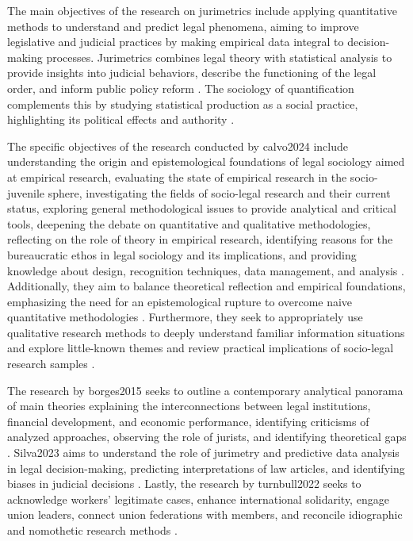 The main objectives of the research on jurimetrics include applying quantitative methods to understand and predict legal phenomena, aiming to improve legislative and judicial practices by making empirical data integral to decision-making processes. Jurimetrics combines legal theory with statistical analysis to provide insights into judicial behaviors, describe the functioning of the legal order, and inform public policy reform \cite{nunes2018, nunes2018, nunes2018, de2010}. The sociology of quantification complements this by studying statistical production as a social practice, highlighting its political effects and authority \cite{paiva2021}.

The specific objectives of the research conducted by calvo2024 include understanding the origin and epistemological foundations of legal sociology aimed at empirical research, evaluating the state of empirical research in the socio-juvenile sphere, investigating the fields of socio-legal research and their current status, exploring general methodological issues to provide analytical and critical tools, deepening the debate on quantitative and qualitative methodologies, reflecting on the role of theory in empirical research, identifying reasons for the bureaucratic ethos in legal sociology and its implications, and providing knowledge about design, recognition techniques, data management, and analysis \cite{calvo2024pages5-7}. Additionally, they aim to balance theoretical reflection and empirical foundations, emphasizing the need for an epistemological rupture to overcome naive quantitative methodologies \cite{calvo2024pages18-19}. Furthermore, they seek to appropriately use qualitative research methods to deeply understand familiar information situations and explore little-known themes \cite{calvo2024pages24-24} and review practical implications of socio-legal research samples \cite{calvo2024pages36-36}.

The research by borges2015 seeks to outline a contemporary analytical panorama of main theories explaining the interconnections between legal institutions, financial development, and economic performance, identifying criticisms of analyzed approaches, observing the role of jurists, and identifying theoretical gaps \cite{borges2015pages12-13}. Silva2023 aims to understand the role of jurimetry and predictive data analysis in legal decision-making, predicting interpretations of law articles, and identifying biases in judicial decisions \cite{silva2023pages16-16,silva2023pages6-7}. Lastly, the research by turnbull2022 seeks to acknowledge workers' legitimate cases, enhance international solidarity, engage union leaders, connect union federations with members, and reconcile idiographic and nomothetic research methods \cite{turnbull2022pages8-9}.

